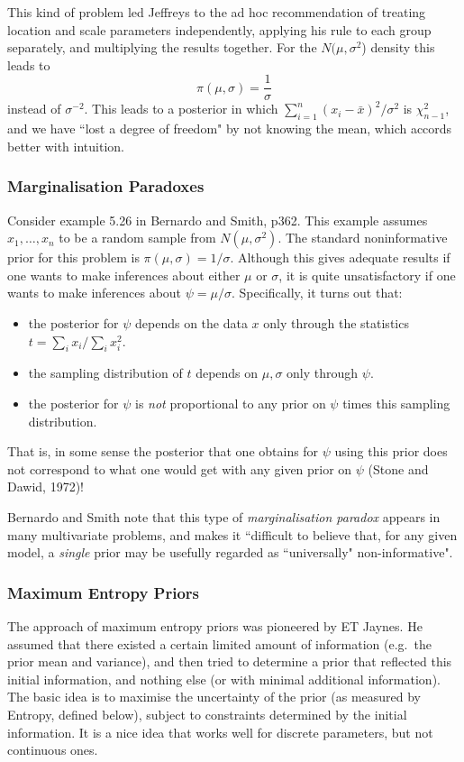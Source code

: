 \documentclass[12pt]{article}
\begin{document}
This kind of problem led Jeffreys to the ad hoc recommendation
of treating location and scale parameters independently, applying his rule to each group
separately, and multiplying the results together.
For the  $N(\mu,\sigma^2$) density this leads to $$\pi(\mu, \sigma) = \frac{1}{\sigma}$$
instead of $\sigma^{-2}$. This leads to a posterior in which $\sum_{i=1}^n (x_i - \bar{x})^2 / \sigma^2$ is $\chi_{n-1}^2$, and we have ``lost a degree of freedom" by not knowing the mean, which accords
better with intuition. 

\subsubsection{Marginalisation Paradoxes}

Consider example 5.26 in Bernardo and Smith, p362.
This example assumes $x_1,\dots,x_n$ to be a random sample from $N(\mu, \sigma^2)$.
The standard noninformative prior for this problem is $\pi(\mu,\sigma) = 1/\sigma$. Although this
gives adequate results if one wants to make inferences about either $\mu$ or $\sigma$, it is quite
unsatisfactory if one wants to make inferences about $\psi = \mu/\sigma$.
Specifically, it turns out that:
\begin{itemize}
\item the posterior for $\psi$ depends on the data $x$ only through
the statistics $t = \sum_i x_i / \sum_i x_i^2$.
\item the sampling distribution of $t$ depends on $\mu,\sigma$ only
through $\psi$.
\item the posterior for $\psi$ is {\it not} proportional to any prior on $\psi$ times
this sampling distribution.
\end{itemize}
That is, in some sense the posterior
that one obtains for $\psi$ using this prior does not correspond to what one would get
with any given prior on $\psi$ (Stone and Dawid, 1972)!

Bernardo and Smith note that this type of {\it marginalisation paradox} appears in many multivariate
problems, and makes it ``difficult to believe that, for any given model, a {\it single} prior may be usefully
regarded as ``universally" non-informative".

\subsubsection{Maximum Entropy Priors}

The approach of maximum entropy priors
was pioneered by ET Jaynes. He assumed that there existed a certain limited
amount of information (e.g.~the prior mean and variance), 
and then tried to determine a prior that reflected this initial information,
and nothing else (or with minimal additional information). 
The basic idea is to maximise the uncertainty of the prior (as measured by Entropy, defined
below), subject to constraints determined by the initial information. It is a nice
idea that works well for discrete parameters, but not continuous ones.
\end{document}
